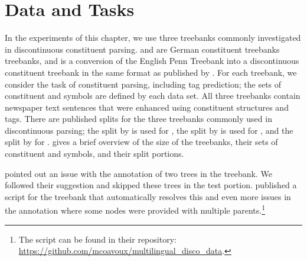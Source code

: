 \documentclass[../../document.tex]{subfiles}
\begin{document}
    \section{Data and Tasks}\label{sec:treebanks}
    In the experiments of this chapter, we use three treebanks commonly investigated in discontinuous constituent parsing.
     \citep{Skut98} and \tiger{} \citep{Brants04} are German constituent treebanks treebanks, and \dptb{} is a conversion of the English Penn Treebank \citep{Marcus94} into a discontinuous constituent treebank in the same format as \negra{} published by \citet{EvaKal11}.
    For each treebank, we consider the task of constituent parsing, including  tag prediction; the sets of constituent and  symbols are defined by each data set.
    All three treebanks contain newspaper text sentences that were enhanced using constituent structures and  tags.
    There are published splits for the three treebanks commonly used in discontinuous parsing; the split by \citet{DubKel03} is used for \negra{}, the split by \citet{Sed13} is used for  \tiger{}, and the split by \citet{collins-1996-new} for \dptb{}.
     gives a brief overview of the size of the treebanks, their sets of constituent and  symbols, and their split portions.
    
     pointed out an issue with the annotation of two trees in the \tiger{} treebank.
    We followed their suggestion and skipped these trees in the test portion.
     published a script for the \tiger{} treebank that automatically resolves this and even more issues in the annotation where some nodes were provided with multiple parents.\footnote{The script can be found in their repository: \url{https://github.com/mcoavoux/multilingual_disco_data}.}
\end{document}
